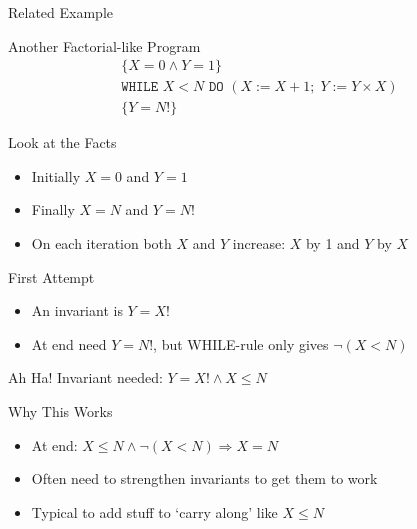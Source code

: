 \begin{frame}{Related Example}
    \begin{block}{Another Factorial-like Program}
        \begin{align*}
        \{X=0 \wedge Y=1\} \\
        \texttt{WHILE } X < N \texttt{ DO } (X:=X+1; \; Y:=Y \times X) \\
        \{Y=N!\}
        \end{align*}
    \end{block}
    
    \begin{block}{Look at the Facts}
        \begin{itemize}
            \item Initially $X=0$ and $Y=1$
            \item Finally $X=N$ and $Y=N!$
            \item On each iteration both $X$ and $Y$ increase: $X$ by 1 and $Y$ by $X$
        \end{itemize}
    \end{block}
    
    \begin{block}{First Attempt}
        \begin{itemize}
            \item An invariant is $Y = X!$
            \item At end need $Y = N!$, but WHILE-rule only gives $\neg(X<N)$
        \end{itemize}
    \end{block}
    
    \begin{alertblock}{Ah Ha!}
        Invariant needed: $Y = X! \wedge X \leq N$
    \end{alertblock}
    
    \begin{block}{Why This Works}
        \begin{itemize}
            \item At end: $X \leq N \wedge \neg(X<N) \Rightarrow X=N$
            \item Often need to strengthen invariants to get them to work
            \item Typical to add stuff to `carry along' like $X \leq N$
        \end{itemize}
    \end{block}
\end{frame}